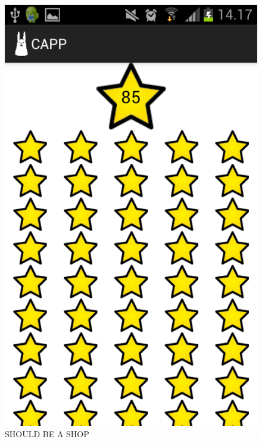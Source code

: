 \begin{figure}
\begin{minipage}[b]{0.4\linewidth}
			\includegraphics[width=0.20\paperwidth]{Pictures/app-screenshots/capp_stars.png}
		\caption{SHOULD BE A SHOP}
		\label{fig:capp_store}
	\end{minipage} 
\end{figure}

